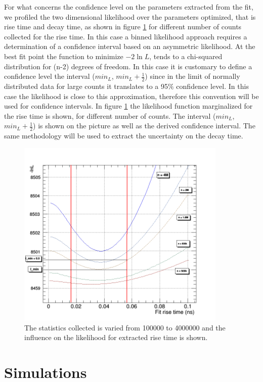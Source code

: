 For what concerns the confidence level on the parameters extracted from the fit, we profiled the two dimensional likelihood over the parameters optimized, that is rise time and decay time, as shown in figure \ref{fig:likelihood} for different number of counts collected for the rise time.
In this case a binned likelihood approach requires a determination of a confidence interval based on an asymmetric likelihood.
At the best fit point the function to minimize  $-2\ln{L}$, tends to a chi-squared distribution for (n-2) degrees of freedom. In this case it is customary to define a confidence level the interval ($min_{L}$, $min_{L}+\frac{1}{2}$) since in the limit of normally distributed data for large counts it translates to a 95$\%$ confidence level. In this case the likelihood is close to this approximation, therefore this convention will be used for confidence intervals.
In figure \ref{fig:likelihood} the likelihood function marginalized for the rise time is shown, for different number of counts. The interval ($min_{L}$, $min_{L}+\frac{1}{2}$) is shown on the picture as well as the derived confidence interval. The same methodology will be used to extract the uncertainty on the decay time.
\begin{figure}[htbp]
\begin{center}
\includegraphics[width=10cm]{../Pictures/Chapter_6/error_rise.png}
\end{center}
\caption[Influence of statistics on likelihhod]{The statistics collected is varied from 100000 to 4000000 and the influence on the likelihood for extracted rise time is shown.}
\label{fig:likelihood}
\end{figure}

\section{Simulations}


